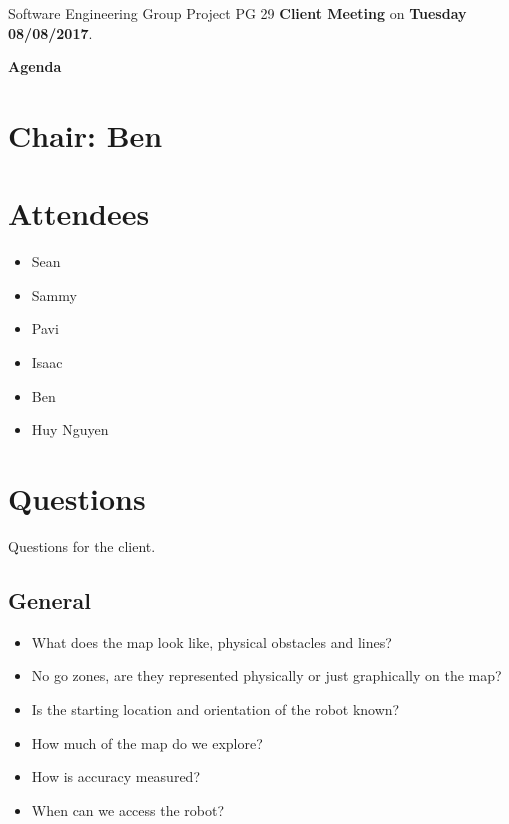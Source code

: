 \documentclass[11pt, a4paper]{article}
\begin{document}
\noindent Software Engineering Group Project PG 29 {\bf Client Meeting} on {\bf Tuesday 08/08/2017}.
\vspace*{10pt}
\begin{center}
\huge \bf Agenda
\end{center}

\section*{Chair: Ben}

\vspace*{10pt}

\section{Attendees}
\begin{itemize}
\item Sean
\item Sammy
\item Pavi
\item Isaac
\item Ben
\item Huy Nguyen
\end{itemize}

\section{Questions}
Questions for the client.

\subsection{General}
\begin{itemize}
\item What does the map look like, physical obstacles and lines?
\item No go zones, are they represented physically or just graphically on the map?
\item Is the starting location and orientation of the robot known?
\item How much of the map do we explore?
\item How is accuracy measured?
\item When can we access the robot?
\end{itemize}
\end{document}

